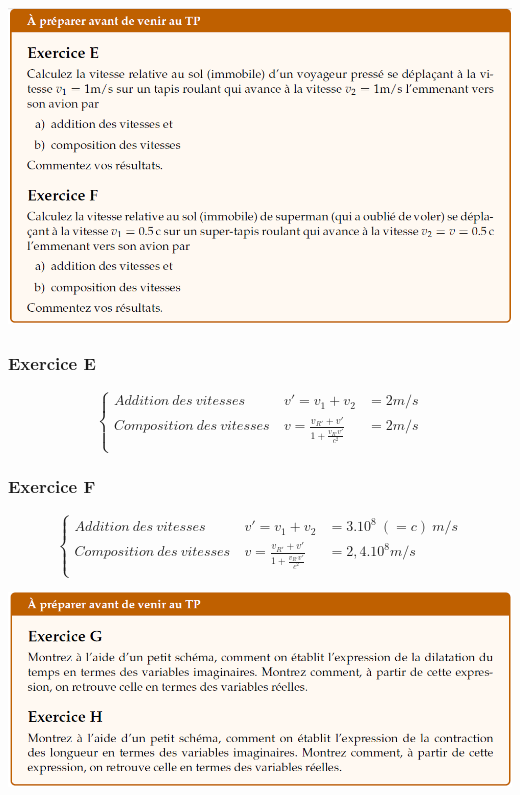 \documentclass	[11pt, a4paper, openany]{book}
\begin{document}
		
		
		
		\begin{center}
			\includegraphics[scale=0.60]{prepa/physmE.png}\\
		\end{center}
		\subsubsection*{Exercice E}
		
		$$\left\{\begin{array}{lll}
		Addition\ des\ vitesses\ & v' = v_1 + v_2 & = 2m/s \\
		Composition\ des\ vitesses\ & v = \frac{v_{R'} + v'}{1 + \frac{v_{R'}v'}{c^2}} & = 2m/s\\
		\end{array}\right.$$
		
		\subsubsection*{Exercice F}
		$$\left\{\begin{array}{lll}
		Addition\ des\ vitesses\ & v' = v_1 + v_2 & = 3.10^8\ (=c)\ m/s \\
		Composition\ des\ vitesses\ & v = \frac{v_{R'} + v'}{1 + \frac{v_{R'}v'}{c^2}} & = 2,4.10^8m/s\\
		\end{array}\right.$$
		
		\begin{center}
			\includegraphics[scale=0.60]{prepa/physmG.png}\\
		\end{center}
		
\end{document}
